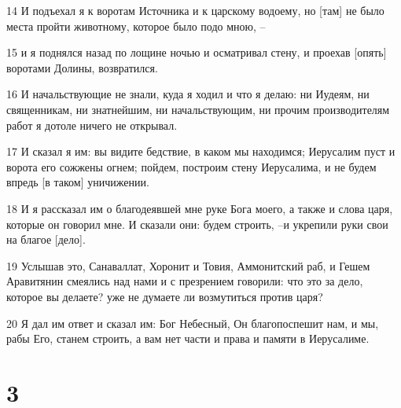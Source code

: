 \par 14 И подъехал я к воротам Источника и к царскому водоему, но [там] не было места пройти животному, которое было подо мною, --
\par 15 и я поднялся назад по лощине ночью и осматривал стену, и проехав [опять] воротами Долины, возвратился.
\par 16 И начальствующие не знали, куда я ходил и что я делаю: ни Иудеям, ни священникам, ни знатнейшим, ни начальствующим, ни прочим производителям работ я дотоле ничего не открывал.
\par 17 И сказал я им: вы видите бедствие, в каком мы находимся; Иерусалим пуст и ворота его сожжены огнем; пойдем, построим стену Иерусалима, и не будем впредь [в таком] уничижении.
\par 18 И я рассказал им о благодеявшей мне руке Бога моего, а также и слова царя, которые он говорил мне. И сказали они: будем строить, --и укрепили руки свои на благое [дело].
\par 19 Услышав это, Санаваллат, Хоронит и Товия, Аммонитский раб, и Гешем Аравитянин смеялись над нами и с презрением говорили: что это за дело, которое вы делаете? уже не думаете ли возмутиться против царя?
\par 20 Я дал им ответ и сказал им: Бог Небесный, Он благопоспешит нам, и мы, рабы Его, станем строить, а вам нет части и права и памяти в Иерусалиме.

\chapter{3}

